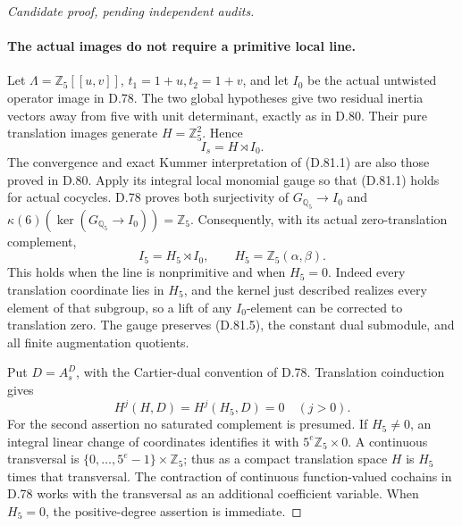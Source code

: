 \begin{proof}[Candidate proof, pending independent audits]
\paragraph{The actual images do not require a primitive local line.}
Let \(\Lambda=\mathbb Z_5[[u,v]]\), \(t_1=1+u,t_2=1+v\), and let
\(I_0\) be the actual untwisted operator image in D.78.
The two global hypotheses give two residual inertia vectors away
from five with unit determinant, exactly as in D.80. Their pure
translation images generate \(H=\mathbb Z_5^2\). Hence
\[
                         I_s=H\rtimes I_0.             \tag{D.81.5}
\]
The convergence and exact Kummer interpretation of (D.81.1) are
also those proved in D.80. Apply its integral local monomial gauge
so that (D.81.1) holds for actual cocycles. D.78 proves both
surjectivity of \(G_{\mathbb Q_5}\to I_0\) and
\(\kappa(6)(\ker(G_{\mathbb Q_5}\to I_0))=\mathbb Z_5\).
Consequently, with its actual zero-translation complement,
\[
 I_5=H_5\rtimes I_0,\qquad
 H_5=\mathbb Z_5(\alpha,\beta).                         \tag{D.81.6}
\]
This holds when the line is nonprimitive and when \(H_5=0\).
Indeed every translation coordinate lies in \(H_5\), and the
kernel just described realizes every element of that subgroup,
so a lift of any \(I_0\)-element can be corrected to translation zero.
The gauge preserves (D.81.5), the constant dual submodule, and
all finite augmentation quotients.

Put \(D=A_s^D\), with the Cartier-dual convention of D.78.
Translation coinduction gives
\[
 H^j(H,D)=H^j(H_5,D)=0\quad(j>0).                       \tag{D.81.7}
\]
For the second assertion no saturated complement is presumed.
If \(H_5\ne0\), an integral linear change of coordinates identifies
it with \(5^e\mathbb Z_5\times0\). A continuous transversal is
\(\{0,\ldots,5^e-1\}\times\mathbb Z_5\); thus as a compact
translation space \(H\) is \(H_5\) times that transversal.
The contraction of continuous function-valued cochains in D.78
works with the transversal as an additional coefficient variable.
When \(H_5=0\), the positive-degree assertion is immediate.


\end{proof}
